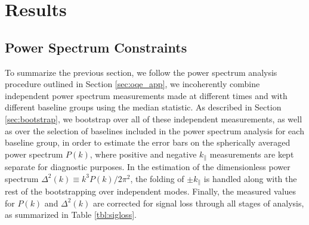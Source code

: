 \documentclass[twocolumn,numberedappendix]{emulateapj} \shorttitle{New Limits on the 21 cm Power Spectrum at $z=8.4$}
\begin{document}
%




\section{Results}\label{sec:results}

\subsection{Power Spectrum Constraints}
To summarize the previous section, we follow 
the power spectrum analysis procedure outlined in Section \ref{sec:oqe_app},
we incoherently combine independent power spectrum measurements made at different
times and with different baseline groups using the median statistic.  As described
in Section \ref{sec:bootstrap}, we bootstrap over all of these independent measurements,
as well as over the selection of baselines included in the power spectrum analysis for
each baseline group, in order to estimate the error bars on the spherically averaged
power spectrum $P(k)$, where positive and negative $k_\parallel$ measurements
are kept separate for diagnostic purposes.  In the estimation of the 
dimensionless power spectrum
$\Delta^{2}(k)\equiv{k^{3}P(k)}/{2\pi^{2}}$, the folding of $\pm k_\parallel$ is
handled along with the rest of the bootstrapping over independent modes.
Finally, the measured values for $P(k)$ and $\Delta^2(k)$ are corrected for signal
loss through all stages of analysis, as summarized in Table \ref{tbl:sigloss}.
\end{document}

